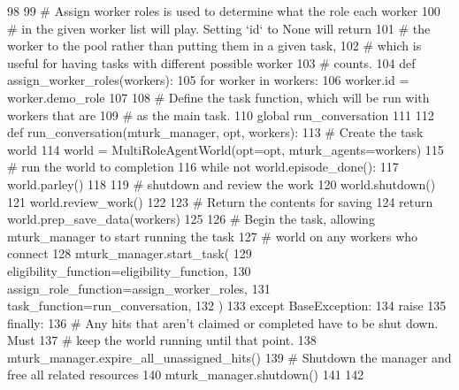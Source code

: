 \begin{DoxyCode}
98 
99         \textcolor{comment}{# Assign worker roles is used to determine what the role each worker}
100         \textcolor{comment}{# in the given worker list will play. Setting `id` to None will return}
101         \textcolor{comment}{# the worker to the pool rather than putting them in a given task,}
102         \textcolor{comment}{# which is useful for having tasks with different possible worker}
103         \textcolor{comment}{# counts.}
104         \textcolor{keyword}{def }assign\_worker\_roles(workers):
105             \textcolor{keywordflow}{for} worker \textcolor{keywordflow}{in} workers:
106                 worker.id = worker.demo\_role
107 
108         \textcolor{comment}{# Define the task function, which will be run with workers that are}
109         \textcolor{comment}{# as the main task.}
110         \textcolor{keyword}{global} run\_conversation
111 
112         \textcolor{keyword}{def }run\_conversation(mturk\_manager, opt, workers):
113             \textcolor{comment}{# Create the task world}
114             world = MultiRoleAgentWorld(opt=opt, mturk\_agents=workers)
115             \textcolor{comment}{# run the world to completion}
116             \textcolor{keywordflow}{while} \textcolor{keywordflow}{not} world.episode\_done():
117                 world.parley()
118 
119             \textcolor{comment}{# shutdown and review the work}
120             world.shutdown()
121             world.review\_work()
122 
123             \textcolor{comment}{# Return the contents for saving}
124             \textcolor{keywordflow}{return} world.prep\_save\_data(workers)
125 
126         \textcolor{comment}{# Begin the task, allowing mturk\_manager to start running the task}
127         \textcolor{comment}{# world on any workers who connect}
128         mturk\_manager.start\_task(
129             eligibility\_function=eligibility\_function,
130             assign\_role\_function=assign\_worker\_roles,
131             task\_function=run\_conversation,
132         )
133     \textcolor{keywordflow}{except} BaseException:
134         \textcolor{keywordflow}{raise}
135     \textcolor{keywordflow}{finally}:
136         \textcolor{comment}{# Any hits that aren't claimed or completed have to be shut down. Must}
137         \textcolor{comment}{# keep the world running until that point.}
138         mturk\_manager.expire\_all\_unassigned\_hits()
139         \textcolor{comment}{# Shutdown the manager and free all related resources}
140         mturk\_manager.shutdown()
141 
142 
\end{DoxyCode}
